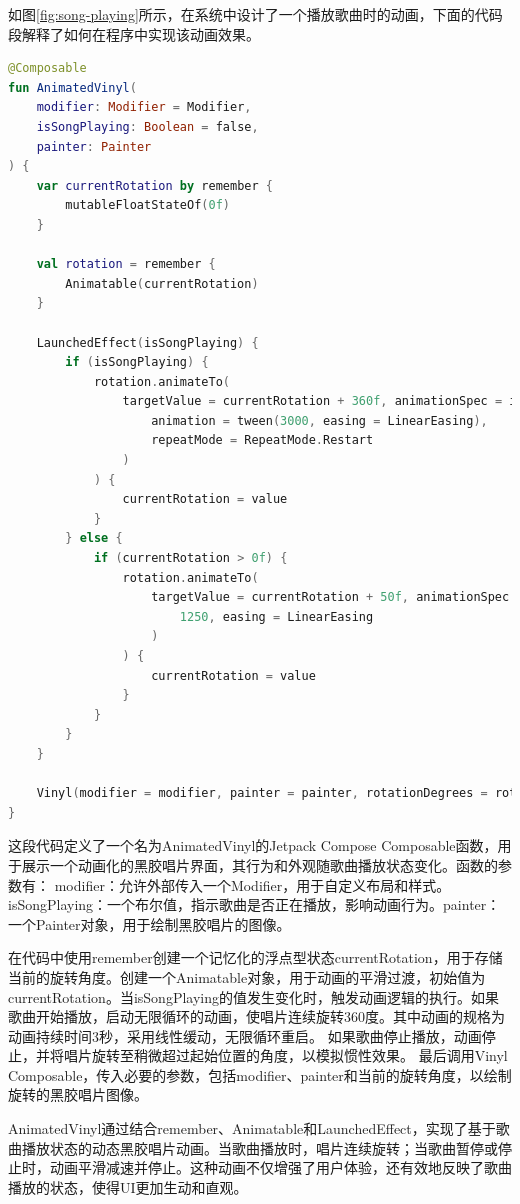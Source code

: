 \documentclass[main.tex]{subfiles}
\begin{document}
如图\ref{fig:song-playing}所示，在系统中设计了一个播放歌曲时的动画，下面的代码段解释了如何在程序中实现该动画效果。

\begin{lstlisting}[language=Kotlin]
@Composable
fun AnimatedVinyl(
    modifier: Modifier = Modifier,
    isSongPlaying: Boolean = false,
    painter: Painter
) {
    var currentRotation by remember {
        mutableFloatStateOf(0f)
    }

    val rotation = remember {
        Animatable(currentRotation)
    }

    LaunchedEffect(isSongPlaying) {
        if (isSongPlaying) {
            rotation.animateTo(
                targetValue = currentRotation + 360f, animationSpec = infiniteRepeatable(
                    animation = tween(3000, easing = LinearEasing),
                    repeatMode = RepeatMode.Restart
                )
            ) {
                currentRotation = value
            }
        } else {
            if (currentRotation > 0f) {
                rotation.animateTo(
                    targetValue = currentRotation + 50f, animationSpec = tween(
                        1250, easing = LinearEasing
                    )
                ) {
                    currentRotation = value
                }
            }
        }
    }

    Vinyl(modifier = modifier, painter = painter, rotationDegrees = rotation.value)
}
\end{lstlisting}

这段代码定义了一个名为AnimatedVinyl的Jetpack Compose Composable函数，用于展示一个动画化的黑胶唱片界面，其行为和外观随歌曲播放状态变化。函数的参数有： modifier：允许外部传入一个Modifier，用于自定义布局和样式。isSongPlaying：一个布尔值，指示歌曲是否正在播放，影响动画行为。painter：一个Painter对象，用于绘制黑胶唱片的图像。

在代码中使用remember创建一个记忆化的浮点型状态currentRotation，用于存储当前的旋转角度。创建一个Animatable对象，用于动画的平滑过渡，初始值为currentRotation。当isSongPlaying的值发生变化时，触发动画逻辑的执行。如果歌曲开始播放，启动无限循环的动画，使唱片连续旋转360度。其中动画的规格为动画持续时间3秒，采用线性缓动，无限循环重启。
如果歌曲停止播放，动画停止，并将唱片旋转至稍微超过起始位置的角度，以模拟惯性效果。
最后调用Vinyl Composable，传入必要的参数，包括modifier、painter和当前的旋转角度，以绘制旋转的黑胶唱片图像。

AnimatedVinyl通过结合remember、Animatable和LaunchedEffect，实现了基于歌曲播放状态的动态黑胶唱片动画。当歌曲播放时，唱片连续旋转；当歌曲暂停或停止时，动画平滑减速并停止。这种动画不仅增强了用户体验，还有效地反映了歌曲播放的状态，使得UI更加生动和直观。
\end{document}
